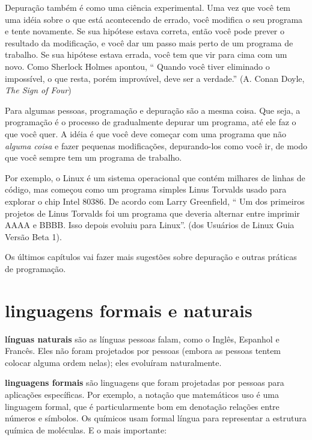 \documentclass[10pt]{book}
\begin{document}
Depuração também é como uma ciência experimental. Uma vez que você tem uma idéia
sobre o que está acontecendo de errado, você modifica o seu programa e tente novamente. Se
sua hipótese estava correta, então você pode prever o resultado da
modificação, e você dar um passo mais perto de um programa de trabalho. Se
sua hipótese estava errada, você tem que vir para cima com um novo. Como
Sherlock Holmes apontou, `` Quando você tiver eliminado o
impossível, o que resta, porém improvável, deve ser a verdade.''
(A. Conan Doyle, {\em The Sign of Four})

Para algumas pessoas, programação e depuração são a mesma coisa. Que
seja, a programação é o processo de gradualmente depurar um programa, até
ele faz o que você quer. A idéia é que você deve começar com uma
programa que não {\em alguma coisa} e fazer pequenas modificações,
depurando-los como você ir, de modo que você sempre tem um programa de trabalho.

Por exemplo, o Linux é um sistema operacional que contém milhares de
linhas de código, mas começou como um programa simples Linus Torvalds
usado para explorar o chip Intel 80386. De acordo com Larry Greenfield,
`` Um dos primeiros projetos de Linus Torvalds foi um programa que deveria alternar
entre imprimir AAAA e BBBB. Isso depois evoluiu para Linux''.
({\Em dos Usuários de Linux Guia} Versão Beta 1).

Os últimos capítulos vai fazer mais sugestões sobre depuração e outras
práticas de programação.


\section{linguagens formais e naturais}

{\bf línguas naturais} são as línguas pessoas falam,
como o Inglês, Espanhol e Francês. Eles não foram projetados
por pessoas (embora as pessoas tentem colocar alguma ordem nelas);
eles evoluíram naturalmente.

{\bf linguagens formais} são linguagens que foram projetadas por pessoas para
aplicações específicas. Por exemplo, a notação que matemáticos
uso é uma linguagem formal, que é particularmente bom em denotação
relações entre números e símbolos. Os químicos usam formal
língua para representar a estrutura química de moléculas. E
o mais importante:
\end{document}
